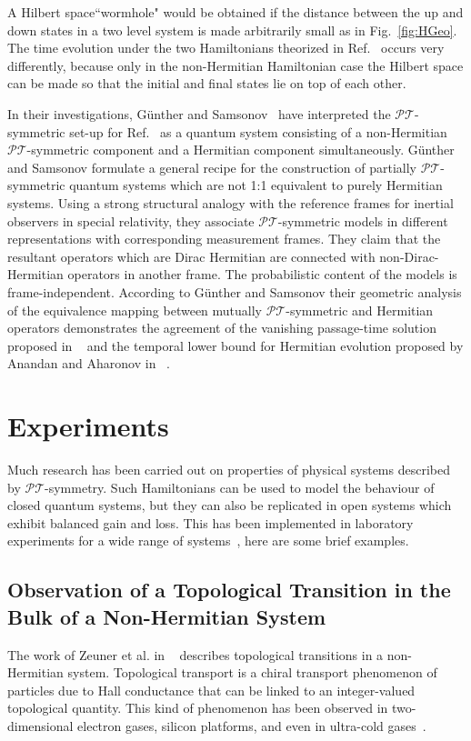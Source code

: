 \documentclass[12pt, a4paper]{report}
\newcommand\PT{\(\mathcal{PT}\)}
\begin{document}
A Hilbert space``wormhole" would be obtained if the distance between the up and down states in a two level system is made arbitrarily small as in
Fig.~\ref{fig:HGeo}. The time evolution under the two Hamiltonians theorized in Ref.~\cite{Bender_2007} occurs very differently, because only in the non-Hermitian Hamiltonian case the Hilbert space can be made so that the initial and final states lie on top of each other.

In their investigations, G\"{u}nther and Samsonov~\cite{Gunther_2008} have interpreted the \PT-symmetric set-up for Ref.~\cite{Bender_2007} as a quantum system consisting of a non-Hermitian \PT-symmetric component and a Hermitian component simultaneously. G\"{u}nther and Samsonov formulate a general recipe for the construction of partially \PT-symmetric quantum systems which are not 1:1 equivalent to purely Hermitian systems. Using a strong structural analogy with the reference frames for inertial observers in special relativity, they associate \PT-symmetric models in different
representations with corresponding measurement frames. They claim that the resultant operators which are Dirac Hermitian
are connected with non-Dirac-Hermitian operators in another frame. The probabilistic content of the models
is frame-independent. According to G\"{u}nther and Samsonov their geometric analysis of the equivalence mapping between mutually \PT-symmetric and Hermitian operators demonstrates the agreement of the vanishing passage-time solution proposed in ~\cite{Bender_2007} and the temporal lower bound for Hermitian evolution proposed by Anandan and Aharonov in ~\cite{AnandanAharonov}. 

\chapter{Experiments}\label{Experiments}
Much research has been carried out on properties of physical systems described by \PT-symmetry. Such Hamiltonians can be used to model the behaviour of closed quantum systems, but they can also be replicated in open systems which exhibit balanced gain and loss. This has been implemented in laboratory experiments for a wide range of systems~\cite{geometric_aspects}, here are some brief examples.

\section{Observation of a Topological Transition in the Bulk of a Non-Hermitian System}\label{TopologicalTrans}
The work of Zeuner et al. in ~\cite{TopoTrans} describes topological transitions in a non-Hermitian system. 
Topological transport is a chiral transport phenomenon of particles due to Hall conductance that can be linked to an integer-valued topological quantity. This kind of phenomenon has been observed in two-dimensional electron gases, silicon platforms, and even in ultra-cold gases~\cite{TopoTrans}. 
\end{document}
